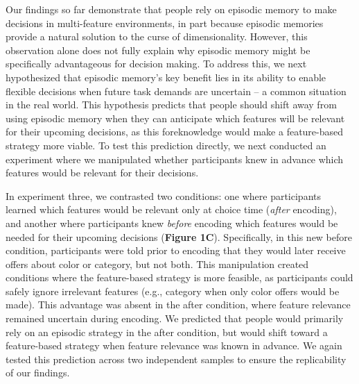 \documentclass[10pt,letterpaper]{article}
\begin{document}
Our findings so far demonstrate that people rely on episodic memory to make decisions in multi-feature environments, in part because episodic memories provide a natural solution to the curse of dimensionality. However, this observation alone does not fully explain why episodic memory might be specifically advantageous for decision making. To address this, we next hypothesized that episodic memory's key benefit lies in its ability to enable flexible decisions when future task demands are uncertain -- a common situation in the real world. This hypothesis predicts that people should shift away from using episodic memory when they can anticipate which features will be relevant for their upcoming decisions, as this foreknowledge would make a feature-based strategy more viable. To test this prediction directly, we next conducted an experiment where we manipulated whether participants knew in advance which features would be relevant for their decisions.

In experiment three, we contrasted two conditions: one where participants learned which features would be relevant only at choice time (\textit{after} encoding), and another where participants knew \textit{before} encoding which features would be needed for their upcoming decisions (\textbf{Figure 1C}). Specifically, in this new before condition, participants were told prior to encoding that they would later receive offers about color or category, but not both. This manipulation created conditions where the feature-based strategy is more feasible, as participants could safely ignore irrelevant features (e.g., category when only color offers would be made). This advantage was absent in the after condition, where feature relevance remained uncertain during encoding. We predicted that people would primarily rely on an episodic strategy in the after condition, but would shift toward a feature-based strategy when feature relevance was known in advance. We again tested this prediction across two independent samples to ensure the replicability of our findings.
\end{document}
